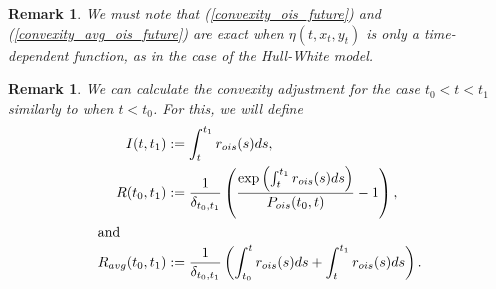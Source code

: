 \documentclass[a4paper,10pt]{article}
\newtheorem{remark}[theorem]{Remark}
\newcommand{\1}{\mathbf{1}}
\begin{document}
\begin{remark}
We must note that (\ref{convexity_ois_future}) and (\ref{convexity_avg_ois_future}) are exact when $\eta(t,x_t, y_t)$ is only a time-dependent function, as in the case of the Hull-White model.
\end{remark}

\begin{remark}
We can calculate the convexity adjustment for the case $t_0 < t < t_1$ similarly to when $t < t_0$. For this, we will define
\begin{align*}
I(t,t_1)&:=\int_{t}^{t_1} r_{ois}(s) ds,\\
R(t_0,t_1) &:= \frac{1}{\delta_{t_0,t_1}}\left(\frac{\exp\left(\int_{t}^{t_1} r_{ois}(s) ds\right)}{P_{ois}(t_0,t)} - 1\right), \\
\intertext{and}
R_{avg}(t_0,t_1) &:= \frac{1}{\delta_{t_0,t_1}}\left(\int_{t_0}^{t} r_{ois}(s) ds + \int_{t}^{t_1} r_{ois}(s) ds\right).   
\end{align*}
\end{remark}
\end{document}
